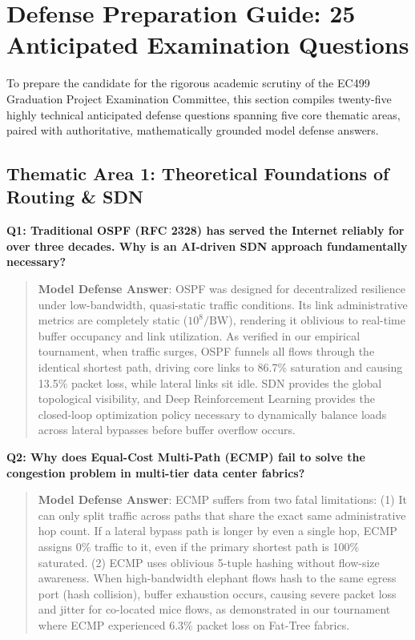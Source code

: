 \documentclass[12pt,a4paper,oneside]{report}
\begin{document}
\section{Defense Preparation Guide: 25 Anticipated Examination Questions}
To prepare the candidate for the rigorous academic scrutiny of the EC499 Graduation Project Examination Committee, this section compiles twenty-five highly technical anticipated defense questions spanning five core thematic areas, paired with authoritative, mathematically grounded model defense answers.

\subsection{Thematic Area 1: Theoretical Foundations of Routing \& SDN}

\noindent\textbf{Q1: Traditional OSPF (RFC 2328) has served the Internet reliably for over three decades. Why is an AI-driven SDN approach fundamentally necessary?}
\begin{quote}
\small
\textbf{Model Defense Answer}: OSPF was designed for decentralized resilience under low-bandwidth, quasi-static traffic conditions. Its link administrative metrics are completely static ($10^8 / \text{BW}$), rendering it oblivious to real-time buffer occupancy and link utilization. As verified in our empirical tournament, when traffic surges, OSPF funnels all flows through the identical shortest path, driving core links to 86.7\% saturation and causing 13.5\% packet loss, while lateral links sit idle. SDN provides the global topological visibility, and Deep Reinforcement Learning provides the closed-loop optimization policy necessary to dynamically balance loads across lateral bypasses before buffer overflow occurs.
\end{quote}

\noindent\textbf{Q2: Why does Equal-Cost Multi-Path (ECMP) fail to solve the congestion problem in multi-tier data center fabrics?}
\begin{quote}
\small
\textbf{Model Defense Answer}: ECMP suffers from two fatal limitations: (1) It can only split traffic across paths that share the exact same administrative hop count. If a lateral bypass path is longer by even a single hop, ECMP assigns 0\% traffic to it, even if the primary shortest path is 100\% saturated. (2) ECMP uses oblivious 5-tuple hashing without flow-size awareness. When high-bandwidth elephant flows hash to the same egress port (hash collision), buffer exhaustion occurs, causing severe packet loss and jitter for co-located mice flows, as demonstrated in our tournament where ECMP experienced 6.3\% packet loss on Fat-Tree fabrics.
\end{quote}
\end{document}
